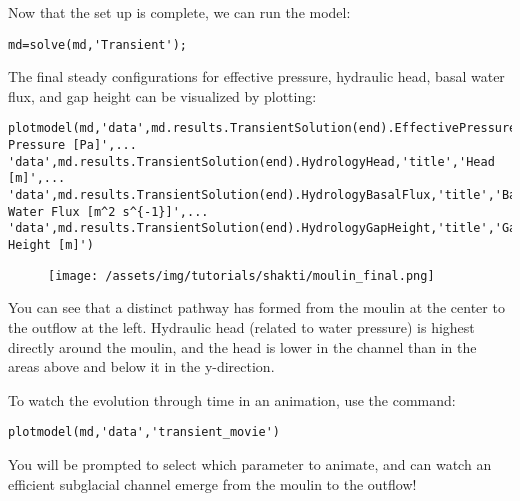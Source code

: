 Now that the set up is complete, we can run the model:
\begin{verbatim}md=solve(md,'Transient');\end{verbatim}

The final steady configurations for effective pressure, hydraulic head, basal water flux, and gap height can be visualized by plotting:
\begin{verbatim}plotmodel(md,'data',md.results.TransientSolution(end).EffectivePressure,'title','Effective Pressure [Pa]',...
'data',md.results.TransientSolution(end).HydrologyHead,'title','Head [m]',...
'data',md.results.TransientSolution(end).HydrologyBasalFlux,'title','Basal Water Flux [m^2 s^{-1}]',...
'data',md.results.TransientSolution(end).HydrologyGapHeight,'title','Gap Height [m]')\end{verbatim}

\begin{figure}[H]
	\begin{center}
		\texttt{[image: /assets/img/tutorials/shakti/moulin\_final.png]}
	\end{center}
\end{figure}

You can see that a distinct pathway has formed from the moulin at the center to the outflow at the left. Hydraulic head (related to water pressure) is highest directly around the moulin, and the head is lower in the channel than in the areas above and below it in the y-direction. 

To watch the evolution through time in an animation, use the command: 
\begin{verbatim}plotmodel(md,'data','transient_movie')\end{verbatim}

You will be prompted to select which parameter to animate, and can watch an efficient subglacial channel emerge from the moulin to the outflow!
